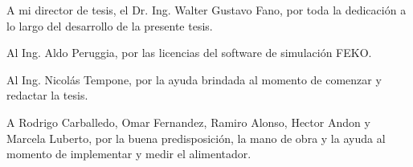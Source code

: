 A mi director de tesis, el Dr. Ing. Walter Gustavo Fano, por toda la dedicación a lo largo del desarrollo de la presente tesis.

Al Ing. Aldo Peruggia, por las licencias del software de simulación FEKO.

Al Ing. Nicolás Tempone, por la ayuda brindada al momento de comenzar y redactar la tesis.

A Rodrigo Carballedo, Omar Fernandez, Ramiro Alonso, Hector Andon y Marcela Luberto, por la buena predisposición, la mano de obra y la ayuda al momento de implementar y medir el alimentador.